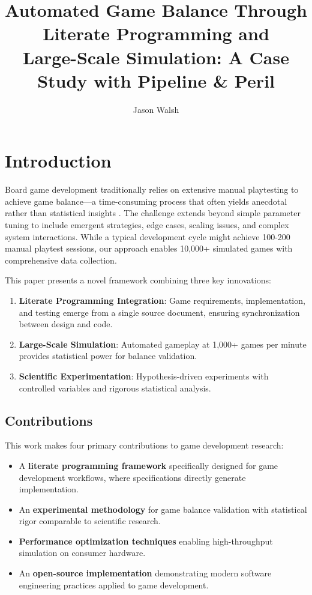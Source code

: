 \documentclass[sigconf]{acmart}
\title{Automated Game Balance Through Literate Programming and\\Large-Scale Simulation: A Case Study with Pipeline \& Peril}
\author{Jason Walsh}
\affiliation{%
  \institution{Independent Researcher}
  \city{San Francisco}
  \state{CA}
  \country{USA}
}
\begin{document}
\maketitle

\section{Introduction}

Board game development traditionally relies on extensive manual playtesting to achieve game balance---a time-consuming process that often yields anecdotal rather than statistical insights \cite{schreiber2010game}. The challenge extends beyond simple parameter tuning to include emergent strategies, edge cases, scaling issues, and complex system interactions. While a typical development cycle might achieve 100-200 manual playtest sessions, our approach enables 10,000+ simulated games with comprehensive data collection.

This paper presents a novel framework combining three key innovations:
\begin{enumerate}
\item \textbf{Literate Programming Integration}: Game requirements, implementation, and testing emerge from a single source document, ensuring synchronization between design and code.
\item \textbf{Large-Scale Simulation}: Automated gameplay at 1,000+ games per minute provides statistical power for balance validation.
\item \textbf{Scientific Experimentation}: Hypothesis-driven experiments with controlled variables and rigorous statistical analysis.
\end{enumerate}

\subsection{Contributions}

This work makes four primary contributions to game development research:

\begin{itemize}
\item A \textbf{literate programming framework} specifically designed for game development workflows, where specifications directly generate implementation.
\item An \textbf{experimental methodology} for game balance validation with statistical rigor comparable to scientific research.
\item \textbf{Performance optimization techniques} enabling high-throughput simulation on consumer hardware.
\item An \textbf{open-source implementation} demonstrating modern software engineering practices applied to game development.
\end{itemize}
\end{document}

